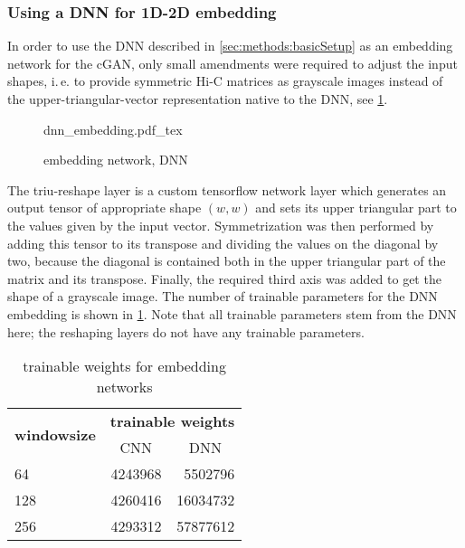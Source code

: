 \subsubsection{Using a DNN for 1D-2D embedding} \label{sec:methods:dnn-embedding}
In order to use the DNN described in \cref{sec:methods:basicSetup} as an embedding network
for the cGAN, only small amendments were required to adjust the input shapes,
i.\,e. to provide symmetric Hi-C matrices as grayscale images instead of the upper-triangular-vector representation
native to the DNN, see \cref{fig:methods:dnn-embedding}.
\begin{figure}[p]
    \scriptsize
    \centering
    {dnn_embedding.pdf_tex}
    \caption{embedding network, DNN} \label{fig:methods:dnn-embedding}
\end{figure}
The triu-reshape layer is a custom tensorflow network layer which generates an output tensor
of appropriate shape $(w,w)$ and sets its upper triangular part to the values given by the input vector.
Symmetrization was then performed by adding this tensor to its transpose and dividing the values on the diagonal by two,
because the diagonal is contained both in the upper triangular part of the matrix and its transpose.
Finally, the required third axis was added to get the shape of a grayscale image.
The number of trainable parameters for the DNN embedding is shown in \cref{tab:methods:embedding_network_params}.
Note that all trainable parameters stem from the DNN here; the reshaping layers do not have any trainable parameters.
\begin{table}[htbp]
\centering
\begin{tabular}{lrr}
\hline
\multicolumn{1}{c}{\multirow{2}{*}{\textbf{windowsize}}} & \multicolumn{2}{c}{\textbf{trainable weights}}    \\
\multicolumn{1}{c}{}                                     & \multicolumn{1}{c}{CNN} & \multicolumn{1}{c}{DNN} \\ \hline
64                                                       & 4243968                 & 5502796                 \\
128                                                      & 4260416                 & 16034732                \\
256                                                      & 4293312                 & 57877612                \\ \hline
\end{tabular}
\caption{trainable weights for embedding networks}\label{tab:methods:embedding_network_params}
\end{table}

